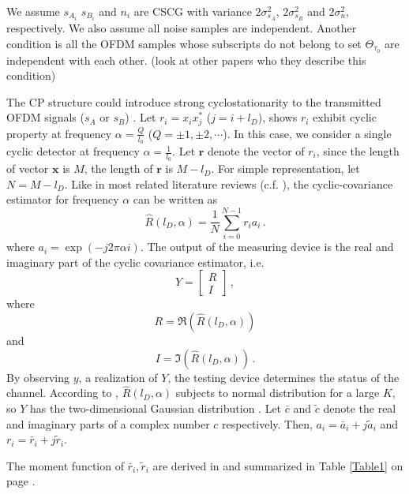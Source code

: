 We  assume $s_{A_i}$ $s_{B_i}$ and $n_i$ are CSCG with variance $2\sigma_{s_A}^2$, $2\sigma_{s_B}^2$  and $2\sigma_n^2$, respectively. We also assume all noise samples are independent. Another condition is all the OFDM samples whose subscripts do not belong to set $\Theta_{\tau_0}$ are independent with each other. (look at other papers who they describe this condition)

The CP structure could introduce strong cyclostationarity to the transmitted OFDM signals ($s_A$ or $s_B$) \cite{lunden2010robust}. 
Let $r_i=x_ix_j^\ast$ ($j=i+l_D$), \cite{lunden2007spectrum} shows $r_i$ exhibit cyclic property at frequency $\alpha = \frac{Q}{l_0}$ ($Q = \pm1, \pm2, \cdots$). In this case, we consider a single cyclic detector at frequency $\alpha = \frac{1}{l_0}$. 
Let $\mathbf{r}$ denote the vector of $r_i$, since the length of vector $\mathbf{x}$ is $M$, the length of $\mathbf{r}$ is $M - l_D$. For simple representation, let $N = M - l_D$.
Like in most related literature reviews (c.f. \cite{lunden2010robust} \cite{dandawate1994statistical}), the cyclic-covariance estimator for frequency $\alpha$ can be written as
\begin{equation}
  \hat{R}(l_D, \alpha) = \frac{1}{N}\sum_{i=0}^{N-1} r_ia_i\,.
  \label{cyclicR}
\end{equation}
where $a_i = \exp(-j2\pi\alpha i)$. 
The output of the measuring device is the real and imaginary part of the cyclic covariance estimator, i.e. 
\begin{equation}
  Y = \begin{bmatrix}
	R \\
	I
  \end{bmatrix}\,,
  \label{cyclic_cov}
\end{equation}
where 
\[
  R = \Re(\hat{R}(l_D, \alpha))
\]
and 
\[
  I = \Im(\hat{R}(l_D, \alpha))\,.
\]
By observing $y$, a realization  of $Y$, the testing device determines the status of the channel.
According to \cite{lunden2010robust}, $\hat{R}(l_D, \alpha)$ subjects to normal distribution for a large $K$, so $Y$ has the two-dimensional Gaussian distribution \cite{goodman1963statistical}.
Let $\bar{c}$ and $\tilde{c}$ denote the real and imaginary parts of a complex number $c$ respectively. Then, $a_i = \bar{a}_i + j\tilde{a}_i$  and $r_i = \bar{r}_i + j\tilde{r}_i$. 

The moment function of $\bar{r}_i, \tilde{r}_i$ are derived in \cite{axell2011optimal} and summarized in Table \ref{Table1} on page \pageref{Table1}.


